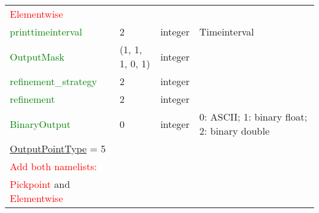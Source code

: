 \documentclass[12pt,twoside]{article}
\begin{document}
\begin{table}[H]
\begin{center}
\begin{tabular}{|p{4.8cm}|p{2.4cm}|p{2cm}|p{5cm}|}
\textcolor{red}{Elementwise} & & &\\
\textcolor{green}{printtimeinterval} & 2 & integer & Timeinterval \\
\textcolor{green}{OutputMask} & (1, 1, 1, 0, 1)& integer & \\
\textcolor{green}{refinement\_strategy} & 2 & integer & \\
\textcolor{green}{refinement} & 2 & integer & \\
\textcolor{green}{BinaryOutput} & 0 & integer & 0: ASCII; 1: binary float; 2: binary double\\
\hdashline
\uline{OutputPointType} = 5 & & &\\
\textcolor{red}{Add both namelists:} & & &\\
\textcolor{red}{Pickpoint} and \textcolor{red}{Elementwise} & & &\\
\hline
\end{tabular}
\end{center}
\end{table}

\newpage
\end{document}
